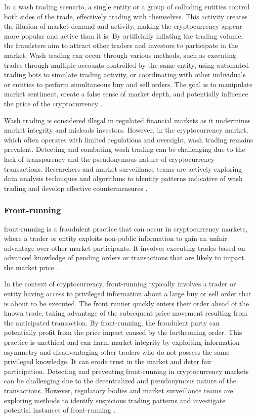 In a wash trading scenario, a single entity or a group of colluding entities control both sides of the trade,
effectively trading with themselves. This activity creates the illusion of market demand and activity, making the
cryptocurrency appear more popular and active than it is. By artificially inflating the trading volume, the fraudsters
aim to attract other traders and investors to participate in the market. Wash trading can occur through various methods,
such as executing trades through multiple accounts controlled by the same entity, using automated trading bots to
simulate trading activity, or coordinating with other individuals or entities to perform simultaneous buy and sell
orders. The goal is to manipulate market sentiment, create a false sense of market depth, and potentially influence the
price of the cryptocurrency \cite{edelman2018detecting}.

Wash trading is considered illegal in regulated financial markets as it undermines market integrity and misleads
investors. However, in the cryptocurrency market, which often operates with limited regulations and oversight, wash
trading remains prevalent. Detecting and combating wash trading can be challenging due to the lack of transparency and
the pseudonymous nature of cryptocurrency transactions. Researchers and market surveillance teams are actively exploring
data analysis techniques and algorithms to identify patterns indicative of wash trading and develop effective
countermeasures \cite{gandal2018price, edelman2018detecting}.

\subsubsection{Front-running}
front-running is a fraudulent practice that can occur in cryptocurrency markets, where a trader or entity exploits
non-public information to gain an unfair advantage over other market participants. It involves executing trades based on
advanced knowledge of pending orders or transactions that are likely to impact the market price \cite{van2021front}.

In the context of cryptocurrency, front-running typically involves a trader or entity having access to privileged
information about a large buy or sell order that is about to be executed. The front runner quickly enters their order
ahead of the known trade, taking advantage of the subsequent price movement resulting from the anticipated transaction.
By front-running, the fraudulent party can potentially profit from the price impact caused by the forthcoming order.
This practice is unethical and can harm market integrity by exploiting information asymmetry and disadvantaging other
traders who do not possess the same privileged knowledge. It can erode trust in the market and deter fair participation.
Detecting and preventing front-running in cryptocurrency markets can be challenging due to the decentralized and
pseudonymous nature of the transactions. However, regulatory bodies and market surveillance teams are exploring methods
to identify suspicious trading patterns and investigate potential instances of front-running \cite{bistarelli2018front}.

